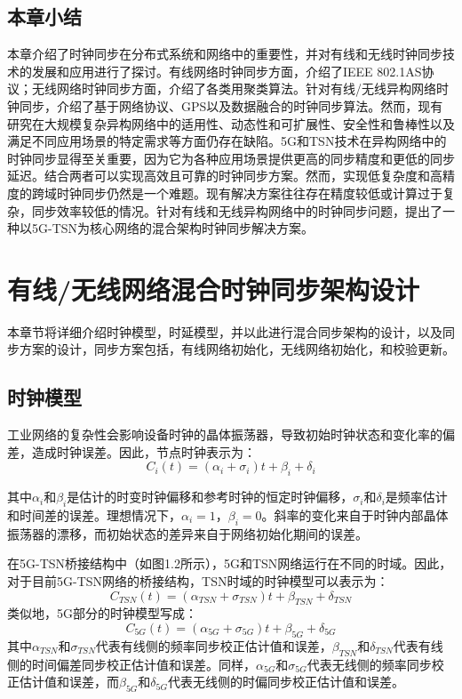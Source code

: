 \documentclass[UTF8,a4paper,12pt]{ctexart}
\numberwithin{equation}{section}
\begin{document}
	\subsection{本章小结}
	本章介绍了时钟同步在分布式系统和网络中的重要性，并对有线和无线时钟同步技术的发展和应用进行了探讨。有线网络时钟同步方面，介绍了IEEE 802.1AS协议；无线网络时钟同步方面，介绍了各类用聚类算法。针对有线/无线异构网络时钟同步，介绍了基于网络协议、GPS以及数据融合的时钟同步算法。然而，现有研究在大规模复杂异构网络中的适用性、动态性和可扩展性、安全性和鲁棒性以及满足不同应用场景的特定需求等方面仍存在缺陷。5G和TSN技术在异构网络中的时钟同步显得至关重要，因为它为各种应用场景提供更高的同步精度和更低的同步延迟。结合两者可以实现高效且可靠的时钟同步方案。然而，实现低复杂度和高精度的跨域时钟同步仍然是一个难题。现有解决方案往往存在精度较低或计算过于复杂，同步效率较低的情况。针对有线和无线异构网络中的时钟同步问题，提出了一种以5G-TSN为核心网络的混合架构时钟同步解决方案。
	
	\newpage
	\section{有线/无线网络混合时钟同步架构设计}
	
	本章节将详细介绍时钟模型，时延模型，并以此进行混合同步架构的设计，以及同步方案的设计，同步方案包括，有线网络初始化，无线网络初始化，和校验更新。
	
	\subsection{时钟模型}
	工业网络的复杂性会影响设备时钟的晶体振荡器，导致初始时钟状态和变化率的偏差，造成时钟误差。因此，节点时钟表示为：
	\begin{equation}
		C_i(t) = (\alpha _i+\sigma_i)t + \beta _i +\delta_i
	\end{equation}
	
	其中$\alpha_i$和$\beta_i$是估计的时变时钟偏移和参考时钟的恒定时钟偏移，$\sigma_i$和$\delta_i$是频率估计和时间差的误差。理想情况下，$\alpha_i = 1$，$\beta_i = 0$。斜率的变化来自于时钟内部晶体振荡器的漂移，而初始状态的差异来自于网络初始化期间的误差。
	
	在5G-TSN桥接结构中（如图1.2所示），5G和TSN网络运行在不同的时域。因此，对于目前5G-TSN网络的桥接结构，TSN时域的时钟模型可以表示为：
	\begin{equation}
		C_{TSN}(t) = (\alpha_{TSN}+\sigma_{TSN})t + \beta _{TSN} +\delta_{TSN}
	\end{equation}
	类似地，5G部分的时钟模型写成：
	\begin{equation}
		C_{5G}(t) = (\alpha_{5G}+\sigma_{5G})t + \beta _{5G} +\delta_{5G}
	\end{equation}
	其中$\alpha_{TSN}$和$\sigma_{TSN}$代表有线侧的频率同步校正估计值和误差，$\beta_{TSN}$和$\delta_{TSN}$代表有线侧的时间偏差同步校正估计值和误差。同样，$\alpha_{5G}$和$\sigma_{5G}$代表无线侧的频率同步校正估计值和误差，而$\beta_{5G}$和$\delta_{5G}$代表无线侧的时偏同步校正估计值和误差。
	
\end{document}
